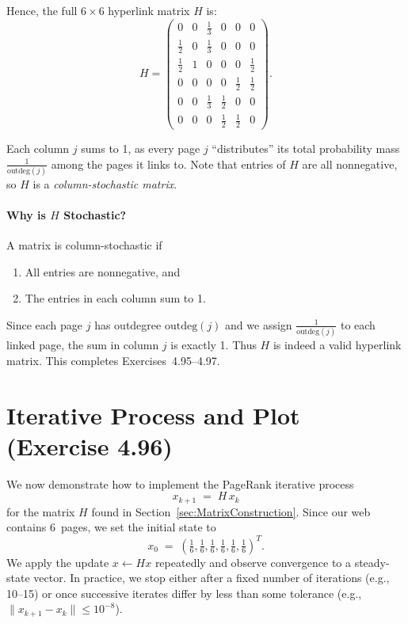 \documentclass{article}
\begin{document}
\bigskip

Hence, the full $6 \times 6$ hyperlink matrix $H$ is:
\[
H 
= 
\begin{pmatrix}
0      & 0      & \tfrac{1}{3} & 0          & 0          & 0 \\
\tfrac{1}{2} & 0      & \tfrac{1}{3} & 0          & 0          & 0 \\
\tfrac{1}{2} & 1      & 0           & 0          & 0          & \tfrac{1}{2} \\
0      & 0      & 0           & 0          & \tfrac{1}{2} & \tfrac{1}{2} \\
0      & 0      & \tfrac{1}{3} & \tfrac{1}{2} & 0          & 0 \\
0      & 0      & 0           & \tfrac{1}{2} & \tfrac{1}{2} & 0
\end{pmatrix}.
\]

\noindent
Each column $j$ sums to 1, as every page $j$ ``distributes'' its total probability mass $\tfrac{1}{\text{outdeg}(j)}$ 
among the pages it links to. Note that entries of $H$ are all nonnegative, so $H$ is a \emph{column-stochastic matrix}.

\paragraph{Why is $H$ Stochastic?}
A matrix is column-stochastic if
\begin{enumerate}
  \item All entries are nonnegative, and 
  \item The entries in each column sum to 1.
\end{enumerate}
Since each page $j$ has outdegree $\text{outdeg}(j)$ and we assign $\tfrac{1}{\text{outdeg}(j)}$ to each linked page, the sum 
in column $j$ is exactly 1. Thus $H$ is indeed a valid hyperlink matrix. This completes Exercises~4.95--4.97.


\section{Iterative Process and Plot (Exercise 4.96)}

We now demonstrate how to implement the PageRank iterative process 
\[
x_{k+1} \;=\; H \, x_{k}
\]
for the matrix \(H\) found in Section~\ref{sec:MatrixConstruction}. 
Since our web contains 6~pages, we set the initial state to
\[
x_0 \;=\; \left(\tfrac{1}{6}, \tfrac{1}{6}, \tfrac{1}{6}, \tfrac{1}{6}, 
\tfrac{1}{6}, \tfrac{1}{6}\right)^T.
\]
We apply the update \(x \leftarrow Hx\) repeatedly and observe convergence 
to a steady-state vector. In practice, we stop either after a fixed number of 
iterations (e.g., 10--15) or once successive iterates differ by less than 
some tolerance (e.g., \(\|x_{k+1} - x_k\|\le 10^{-8}\)).
\end{document}
